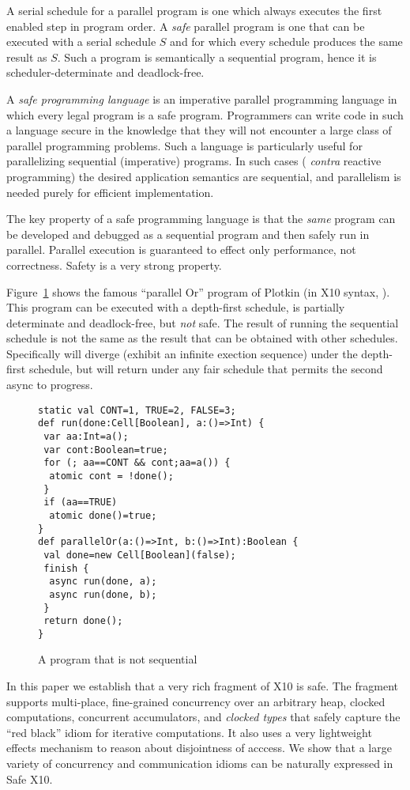 A serial schedule for a parallel program is one which always executes
the first enabled step in program order. A {\em safe} parallel program
is one that can be executed with a serial schedule $S$ and for which
every schedule produces the same result as $S$.  Such a program is
semantically a sequential program, hence it is scheduler-determinate
and deadlock-free.

A {\em safe programming language} is an imperative parallel
programming language in which every legal program is a safe
program. Programmers can write code in such a language secure in the
knowledge that they will not encounter a large class of parallel
programming problems. Such a language is particularly useful for
parallelizing sequential (imperative) programs. In such cases ({\em
  contra} reactive programming) the desired application semantics are
sequential, and parallelism is needed purely for efficient
implementation.

The key property of a safe programming language is that the {\em same}
program can be developed and debugged as a sequential program and then
safely run in parallel. Parallel execution is guaranteed to effect
only performance, not correctness. Safety is a very strong property.

Figure~\ref{fig:1} shows  the famous ``parallel Or'' program of Plotkin
 (in X10 syntax, \cite{x10}). This program can be executed with a
depth-first schedule, is partially determinate and deadlock-free, but {\em not}
safe. The result of running the sequential schedule is not the same as
the result that can be obtained with other schedules. Specifically
 will diverge (exhibit an
infinite exection sequence) under the depth-first schedule, but will
return  under any fair schedule that permits the second
async to progress.

\begin{figure}
  \begin{lstlisting}
static val CONT=1, TRUE=2, FALSE=3;
def run(done:Cell[Boolean], a:()=>Int) {
 var aa:Int=a();
 var cont:Boolean=true;
 for (; aa==CONT && cont;aa=a()) {
  atomic cont = !done();
 }
 if (aa==TRUE)
  atomic done()=true;
}
def parallelOr(a:()=>Int, b:()=>Int):Boolean {
 val done=new Cell[Boolean](false);
 finish {
  async run(done, a);
  async run(done, b);
 }
 return done();
}
  \end{lstlisting}
  \caption{A program that is not sequential}\label{fig:1}
\end{figure}
In this paper we establish that a very rich fragment of X10 is safe.
The fragment supports multi-place, fine-grained concurrency
over an arbitrary heap, clocked computations, concurrent accumulators,
and {\em clocked types} that safely capture the ``red black'' idiom
for iterative computations. It also uses a very lightweight effects
mechanism to reason about disjointness of acccess. We show that a
large variety of concurrency and communication idioms can be naturally
expressed in Safe X10.

